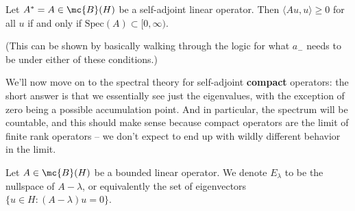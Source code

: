 \begin{corollary}
Let $A^\ast = A \in \mc{B}(H)$ be a self-adjoint linear operator. Then $\langle Au, u \rangle \ge 0$ for all $u$ if and only if $\text{Spec}(A) \subset [0, \infty)$.
\end{corollary}

(This can be shown by basically walking through the logic for what $a_-$ needs to be under either of these conditions.)

We'll now move on to the spectral theory for self-adjoint \textbf{compact} operators: the short answer is that we essentially see just the eigenvalues, with the exception of zero being a possible accumulation point. And in particular, the spectrum will be countable, and this should make sense because compact operators are the limit of finite rank operators -- we don't expect to end up with wildly different behavior in the limit.

\begin{definition}
Let $A \in \mc{B}(H)$ be a bounded linear operator. We denote $E_\lambda$ to be the nullspace of $A - \lambda$, or equivalently the set of eigenvectors $\{u \in H: (A-\lambda)u = 0\}$.
\end{definition}

